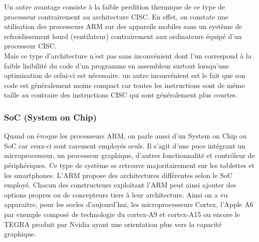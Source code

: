 Un autre avantage consiste à la faible perdition thermique de ce type de processeur contrairement au architecture CISC. En effet, on constate une utilisation des processeurs ARM sur des appareils mobiles sans un système de refroidissement lourd (ventilateur) contrairement aux ordinateurs équipé d'un processeur CISC.
\\
Mais ce type d'architecture n'est pas sans inconvénient dont l'un correspond à la faible lisibilité du code d'un programme en assembleur surtout lorsqu'une optimisation de celui-ci est nécessaire.
un autre inconvénient est le fait que son code est généralement moins compact car toutes les instructions sont de même taille au contraire des instructions CISC qui sont généralement plus courtes.  

\subsubsection{ SoC (System on Chip) }

Quand on évoque les processeurs ARM, on parle aussi d'un System on Chip ou SoC car ceux-ci sont rarement employés seuls. Il s'agit d'une puce intégrant un microprocesseur, un processeur graphique, d'autres fonctionnalité et contrôleur de périphériques. Ce type de système se retrouve majoritairement sur les tablettes et les smartphones. L'ARM propose des architectures différentes selon le SoC employé. Chacun des constructeurs exploitant l'ARM peut ainsi ajouter des options propres ou de concepteurs tiers à leur architecture. Ainsi on a vu apparaitre, pour les socles d'aujourd'hui, les microprocesseurs Cortex, l'Apple A6 par exemple composé de technologie du cortex-A9 et cortex-A15 ou encore le TEGRA produit par Nvidia ayant une orientation plus vers la capacité graphique.

